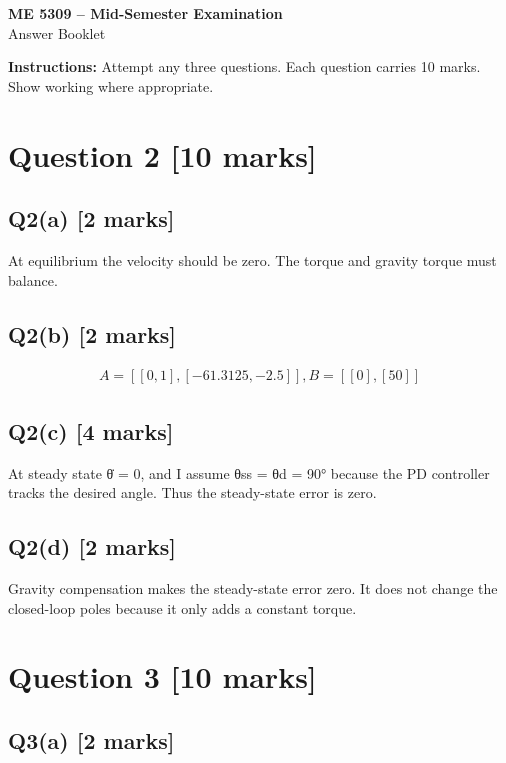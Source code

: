 \documentclass[11pt,a4paper]{article}
\begin{document}
\begin{center}
{\Large\bfseries ME 5309 -- Mid-Semester Examination}\\[3pt]
{\large Answer Booklet}\\[8pt]
\end{center}
\textbf{Instructions:} Attempt any three questions. Each question carries 10 marks. Show working where appropriate.
\section*{Question 2 \hfill [10 marks]}
\subsection*{Q2(a) \hfill [2 marks]}

At equilibrium the velocity should be zero.
The torque and gravity torque must balance.

\subsection*{Q2(b) \hfill [2 marks]}

\[\begin{aligned}A = [[0,1], [-61.3125,-2.5]], B = [[0],[50]]\end{aligned}\]

\subsection*{Q2(c) \hfill [4 marks]}

At steady state θ̇ = 0, and I assume θss = θd = 90° because the PD controller tracks the desired angle.
Thus the steady-state error is zero.

\subsection*{Q2(d) \hfill [2 marks]}

Gravity compensation makes the steady-state error zero.
It does not change the closed-loop poles because it only adds a constant torque.

\section*{Question 3 \hfill [10 marks]}
\subsection*{Q3(a) \hfill [2 marks]}
\end{document}
